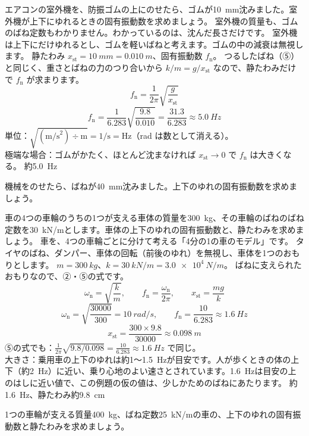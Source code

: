 \label{ph:波-1:ex4}
\begin{phreidai}
エアコンの室外機を、防振ゴムの上にのせたら、ゴムが\qty{10}{mm}沈みました。室外機が上下にゆれるときの固有振動数を求めましょう。
\phbamen
室外機の質量も、ゴムのばね定数もわかりません。わかっているのは、沈んだ長さだけです。
\phmushi
室外機は上下にだけゆれるとし、ゴムを軽いばねと考えます。ゴムの中の減衰は無視します。
\phzu
静たわみ $x_{\mathrm{st}}=\qty{10}{mm}=\qty{0.010}{m}$、固有振動数 $f_{\mathrm n}$。
\phriyu
つるしたばね（⑤）と同じく、重さとばねの力のつり合いから $k/m=g/x_{\mathrm{st}}$ なので、静たわみだけで $f_{\mathrm n}$ が求まります。
\phtateru
\[f_{\mathrm n}=\frac{1}{2\pi}\sqrt{\frac{g}{x_{\mathrm{st}}}}\]
\phtoku
\[f_{\mathrm n}=\frac{1}{6.283}\sqrt{\frac{9.8}{0.010}}=\frac{31.3}{6.283}\approx\qty{5.0}{Hz}\]
\phtashikame
単位：$\sqrt{(\text{m/s}^2)\div\text{m}}=1/\text{s}=\text{Hz}$（rad は数として消える）。\\
極端な場合：ゴムがかたく、ほとんど沈まなければ $x_{\mathrm{st}}\to0$ で $f_{\mathrm n}$ は大きくなる。
\kotae 約\qty{5.0}{Hz}
\end{phreidai}
\begin{jibun}
機械をのせたら、ばねが\qty{40}{mm}沈みました。上下のゆれの固有振動数を求めましょう。
\end{jibun}

\label{ph:波-1:ex5}
\begin{phreidai}[車のサスペンションの固有振動数]
車の4つの車輪のうちの1つが支える車体の質量を\qty{300}{kg}、その車輪のばねのばね定数を\qty{30}{kN/m}とします。車体の上下のゆれの固有振動数と、静たわみを求めましょう。
\phbamen
車を、4つの車輪ごとに分けて考える「4分の1の車のモデル」です。
\phmushi
タイヤのばね、ダンパー、車体の回転（前後のゆれ）を無視し、車体を1つのおもりとします。
\phzu
$m=\qty{300}{kg}$、$k=\qty{30}{kN/m}=\qty{3.0e4}{N/m}$。
\phriyu
ばねに支えられたおもりなので、②・⑤の式です。
\phtateru
\[\omega_{\mathrm n}=\sqrt{\frac{k}{m}},\qquad f_{\mathrm n}=\frac{\omega_{\mathrm n}}{2\pi},\qquad x_{\mathrm{st}}=\frac{mg}{k}\]
\phtoku
\[\omega_{\mathrm n}=\sqrt{\frac{\num{30000}}{300}}=\qty{10}{rad/s},\qquad f_{\mathrm n}=\frac{10}{6.283}\approx\qty{1.6}{Hz}\]
\[x_{\mathrm{st}}=\frac{300\times9.8}{\num{30000}}\approx\qty{0.098}{m}\]
\phtashikame
⑤の式でも：$\tfrac{1}{2\pi}\sqrt{9.8/0.098}=\tfrac{10}{6.283}\approx\qty{1.6}{Hz}$ で同じ。\\
大きさ：乗用車の上下のゆれは約1〜\qty{1.5}{Hz}が目安です。人が歩くときの体の上下（約\qty{2}{Hz}）に近い、乗り心地のよい速さとされています。\qty{1.6}{Hz}は目安の上のはしに近い値で、この例題の仮の値は、少しかためのばねにあたります。
\kotae 約\qty{1.6}{Hz}、静たわみ約\qty{9.8}{cm}
\end{phreidai}
\begin{jibun}
1つの車輪が支える質量\qty{400}{kg}、ばね定数\qty{25}{kN/m}の車の、上下のゆれの固有振動数と静たわみを求めましょう。
\end{jibun}

